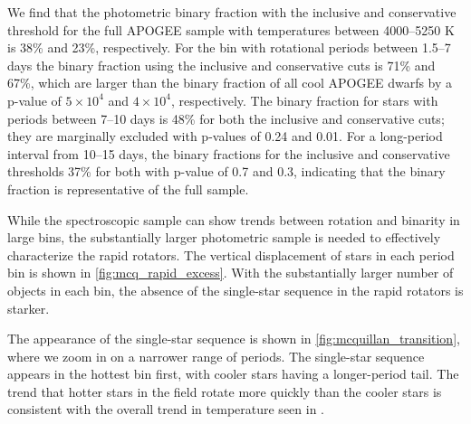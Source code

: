 \documentclass[manuscript]{aastex6}
\begin{document}
We find that the photometric binary fraction with the inclusive and conservative 
threshold for the full APOGEE sample with temperatures between 4000--5250 K is 
38\% and 23\%, respectively. For the bin with rotational periods between 
1.5--7 days the binary fraction using the inclusive and conservative cuts is
71\% and 67\%, which are larger than the binary fraction of all cool APOGEE 
dwarfs by a p-value of \(5 \times 10^4\) and \(4 \times 10^4\), respectively. 
The binary fraction for stars with periods between 7--10 days is 48\% for both 
the inclusive and conservative cuts; they are marginally excluded with p-values
of 0.24 and 0.01. For a long-period interval from 10--15 days, the binary 
fractions for the inclusive and conservative thresholds 37\% for both with 
p-value of 0.7 and 0.3, indicating that the binary fraction is representative 
of the full sample.

\begin{figure*}[htb]
    \centering
    \caption{\emph{Top Left to Bottom Right:} Vertical displacement of all 
        cool \citet{McQuillan14} targets in period bins >10 days, 
        7-10 days, 1.5-7 days, and <1.5 days. Pink stars 
        denote eclipsing binaries with orbital periods within the same ranges. 
        The green and purple lines denote the inclusive and conservative 
    photometric binary thresholds, respectively. The temperatures are from
\citet{Pinsonneault12}.}\label{fig:mcq_rapid_excess}
\end{figure*}

While the spectroscopic sample can show trends between rotation and binarity in
large bins, the substantially larger photometric sample is needed to 
effectively characterize the rapid rotators. The vertical displacement of stars 
in each period bin is shown in \cref{fig:mcq_rapid_excess}. With the 
substantially larger number of objects in each bin, the absence of the
single-star sequence in the rapid rotators is starker.

\begin{figure*}[htb]
    \centering
    \caption{Same as \cref{fig:mcq_rapid_excess} except with the period ranges
    7--9 days, 9--11 days, 11--13 days, and 13--15 days.}
    \label{fig:mcquillan_transition}
\end{figure*}

The appearance of the single-star sequence is shown in
\cref{fig:mcquillan_transition}, where we zoom in on a narrower range of
periods. The single-star sequence appears in the
hottest bin first, with cooler stars having a longer-period tail. The trend
that hotter stars in the field rotate more quickly than the cooler stars 
is consistent with the overall trend in temperature seen in 
\citet{McQuillan14}.
\end{document}
